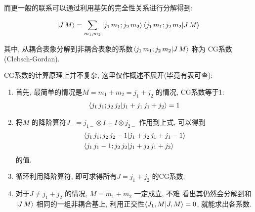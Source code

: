 而更一般的联系可以通过利用基矢的完全性关系进行分解得到:

\begin{equation}
  \begin{aligned}
    \ket{J\,M} = \sum_{m_1,m_2}\ket{j_1\,m_1;j_2\,m_2}\bra{j_1\,m_1;j_2\,m_2}\ket{J\,M}
  \end{aligned}
\end{equation}

其中, 从耦合表象分解到非耦合表象的系数$\bra{j_1\,m_1;j_2\,m_2}\ket{J\,M}$ 称为
CG系数(Clebsch-Gordan).

CG系数的计算原理上并不复杂, 这里仅作概述不展开(毕竟有表可查):

\begin{enumerate}
  \item 首先, 最简单的情况是$M=m_1+m_2=j_1+j_2$ 的情况, CG系数等于1:
    \begin{equation}
      \begin{aligned}
        \bra{j_1\,j_1;j_2\,j_2}\ket{j_1+j_1\,j_1+j_2} = 1
      \end{aligned}
    \end{equation}
  \item 将$M$ 的降阶算符$J_{-} = j_{1-}\otimes I + I\otimes j_{2-}$ 
    作用到上式, 可以得到
    \begin{equation}
      \begin{aligned}
        & \bra{j_1\,j_1;j_2\,j_2-1}\ket{j_1+j_2\,j_1+j_1-1}\\
        & \bra{j_1\,j_1-1;j_2\,j_2}\ket{j_1+j_2\,j_1+j_2}
      \end{aligned}
    \end{equation}
    的值.
  \item 循环利用降阶算符, 即可求得所有$J=j_1+j_2$ 的CG系数.
  \item 对于$J\neq j_1+j_2$ 的情况, $M=m_1+m_2$ 一定成立, 不难
    看出其仍然会分解到和$\ket{J\,M}$ 相同的一组非耦合基上,
    利用正交性$\bra{J_1,M}\ket{J,M}=0$, 就能求出各系数.
\end{enumerate}
